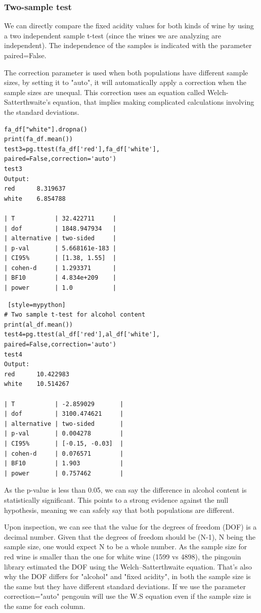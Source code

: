\subsubsection{Two-sample test}
We can directly compare the fixed acidity values for both kinds of wine by using a two independent sample t-test (since the wines we are analyzing are independent). The independence of the samples is indicated with the parameter paired=False.

The correction parameter is used when both populations have different sample sizes, by setting it to "auto", it will automatically apply a correction when the sample sizes are unequal. This correction uses an equation called Welch-Satterthwaite's equation, that implies making complicated calculations involving the standard deviations.
\begin{lstlisting}[style=mypython]
fa_df["white"].dropna()
print(fa_df.mean())
test3=pg.ttest(fa_df['red'],fa_df['white'], paired=False,correction='auto')
test3
Output:
red      8.319637
white    6.854788

| T           | 32.422711     |
| dof         | 1848.947934   |
| alternative | two-sided     |
| p-val       | 5.668161e-183 |
| CI95%       | [1.38, 1.55]  |
| cohen-d     | 1.293371      |
| BF10        | 4.834e+209    |
| power       | 1.0           |
\end{lstlisting}

\begin{lstlisting} [style=mypython]
# Two sample t-test for alcohol content
print(al_df.mean())
test4=pg.ttest(al_df['red'],al_df['white'], paired=False,correction='auto')
test4
Output:
red      10.422983
white    10.514267

| T           | -2.859029       |
| dof         | 3100.474621     |
| alternative | two-sided       |
| p-val       | 0.004278        |
| CI95%       | [-0.15, -0.03]  |
| cohen-d     | 0.076571        |
| BF10        | 1.903           |
| power       | 0.757462        |
\end{lstlisting}


As the p-value is less than 0.05, we can say the difference in alcohol content is statistically significant. This points to a strong evidence against the null hypothesis, meaning we can safely say that both populations are different.

Upon inspection, we can see that the value for the degrees of freedom (DOF) is a decimal number. Given that the degrees of freedom should be (N-1), N being the sample size, one would expect N to be a whole number. As the sample size for red wine is smaller than the one for white wine (1599 vs 4898), the pingouin library estimated the DOF using the Welch–Satterthwaite equation. That's also why the DOF differs for "alcohol" and "fixed acidity", in both the sample size is the same but they have different standard deviations. If we use the parameter correction="auto" pengouin will use the W.S equation even if the sample size is the same for each column.

